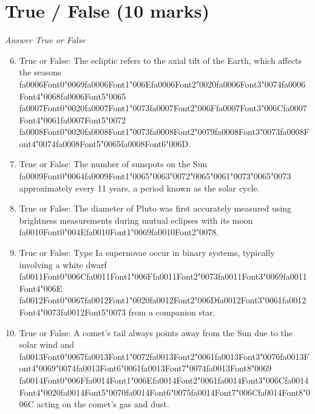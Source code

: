 \documentclass[12pt]{article}
\begin{document}
\section*{True / False (10 marks)}
\textit{Answer True or False}
\begin{enumerate}[label=\arabic*.]
\setcounter{enumi}{5}
\item True or False: The ecliptic refers to the axial tilt of the Earth, which affects the seasons {\csname fa0006Font0\endcsname\char"0069}{\csname fa0006Font1\endcsname\char"006E}{\csname fa0006Font2\endcsname\char"0020}{\csname fa0006Font3\endcsname\char"0074}{\csname fa0006Font4\endcsname\char"0068}{\csname fa0006Font5\endcsname\char"0065} {\csname fa0007Font0\endcsname\char"0020}{\csname fa0007Font1\endcsname\char"0073}{\csname fa0007Font2\endcsname\char"006F}{\csname fa0007Font3\endcsname\char"006C}{\csname fa0007Font4\endcsname\char"0061}{\csname fa0007Font5\endcsname\char"0072} {\csname fa0008Font0\endcsname\char"0020}{\csname fa0008Font1\endcsname\char"0073}{\csname fa0008Font2\endcsname\char"0079}{\csname fa0008Font3\endcsname\char"0073}{\csname fa0008Font4\endcsname\char"0074}{\csname fa0008Font5\endcsname\char"0065}{\csname fa0008Font6\endcsname\char"006D}.
\item True or False: The number of sunspots on the Sun {\csname fa0009Font0\endcsname\char"0064}{\csname fa0009Font1\endcsname\char"0065}{\char"0063}{\char"0072}{\char"0065}{\char"0061}{\char"0073}{\char"0065}{\char"0073} approximately every 11 years, a period known as the solar cycle.
\item True or False: The diameter of Pluto was first accurately measured using brightness measurements during mutual eclipses with its moon {\csname fa0010Font0\endcsname\char"004E}{\csname fa0010Font1\endcsname\char"0069}{\csname fa0010Font2\endcsname\char"0078}.
\item True or False: Type Ia supernovae occur in binary systems, typically involving a white dwarf {\csname fa0011Font0\endcsname\char"006C}{\csname fa0011Font1\endcsname\char"006F}{\csname fa0011Font2\endcsname\char"0073}{\csname fa0011Font3\endcsname\char"0069}{\csname fa0011Font4\endcsname\char"006E} {\csname fa0012Font0\endcsname\char"0067}{\csname fa0012Font1\endcsname\char"0020}{\csname fa0012Font2\endcsname\char"006D}{\csname fa0012Font3\endcsname\char"0061}{\csname fa0012Font4\endcsname\char"0073}{\csname fa0012Font5\endcsname\char"0073} from a companion star.
\item True or False: A comet's tail always points away from the Sun due to the solar wind and {\csname fa0013Font0\endcsname\char"0067}{\csname fa0013Font1\endcsname\char"0072}{\csname fa0013Font2\endcsname\char"0061}{\csname fa0013Font3\endcsname\char"0076}{\csname fa0013Font4\endcsname\char"0069}{\char"0074}{\csname fa0013Font6\endcsname\char"0061}{\csname fa0013Font7\endcsname\char"0074}{\csname fa0013Font8\endcsname\char"0069} {\csname fa0014Font0\endcsname\char"006F}{\csname fa0014Font1\endcsname\char"006E}{\csname fa0014Font2\endcsname\char"0061}{\csname fa0014Font3\endcsname\char"006C}{\csname fa0014Font4\endcsname\char"0020}{\csname fa0014Font5\endcsname\char"0070}{\csname fa0014Font6\endcsname\char"0075}{\csname fa0014Font7\endcsname\char"006C}{\csname fa0014Font8\endcsname\char"006C} acting on the comet's gas and dust.

\end{enumerate}
\end{document}
